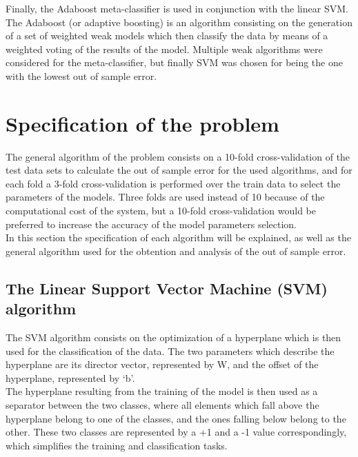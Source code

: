 \documentclass[10pt, journal]{IEEEtran}
\begin{document}
Finally, the Adaboost meta-classifier is used in conjunction with the linear SVM. The Adaboost (or adaptive boosting) is an algorithm consisting on the generation of a set of weighted weak models which then classify the data by means of a weighted voting of the results of the model. Multiple weak algorithms were considered for the meta-classifier, but finally SVM was chosen for being the one with the lowest out of sample error.

\section{Specification of the problem} %
\label{sec:specification_of_the_problem}
The general algorithm of the problem consists on a 10-fold cross-validation of the test data sets to calculate the out of sample error for the used algorithms, and for each fold a 3-fold cross-validation is performed over the train data to select the parameters of the models. Three folds are used instead of 10 because of the computational cost of the system, but a 10-fold cross-validation would be preferred to increase the accuracy of the model parameters selection.\\	

In this section the specification of each algorithm will be explained, as well as the general algorithm used for the obtention and analysis of the out of sample error.

\subsection{The Linear Support Vector Machine (SVM) algorithm} %
\label{sub:the_linear_support_vector_machine_svm_algorithm}
The SVM algorithm consists on the optimization of a hyperplane which is then used for the classification of the data. The two parameters which describe the hyperplane are its director vector, represented by W, and the offset of the hyperplane, represented by `b'.\\

The hyperplane resulting from the training of the model is then used as a separator between the two classes, where all elements which fall above the hyperplane belong to one of the classes, and the ones falling below belong to the other. These two classes are represented by a +1 and a -1 value correspondingly, which simplifies the training and classification tasks.\\
\end{document}
